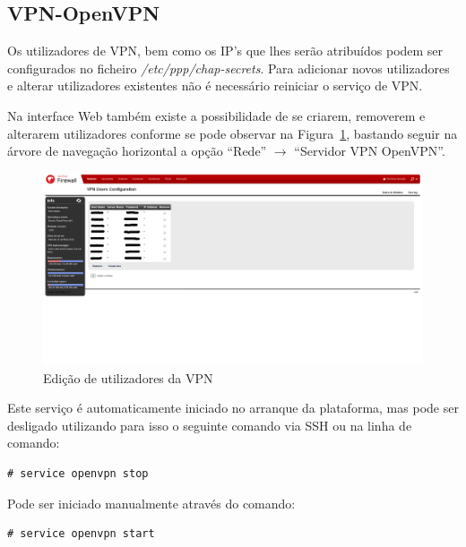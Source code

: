 \subsection*{VPN-OpenVPN}

Os utilizadores de VPN, bem como os IP's que lhes serão atribuídos podem ser
configurados no ficheiro \emph{/etc/ppp/chap-secrets}.
Para adicionar novos utilizadores e alterar utilizadores existentes não é necessário reiniciar o serviço de VPN.

Na interface Web também existe a possibilidade de se criarem, removerem e alterarem
utilizadores conforme se pode observar na Figura~\ref{fig:vpn}, bastando seguir na árvore de navegação horizontal a opção ``Rede'' $\rightarrow$ ``Servidor VPN OpenVPN''.

\begin{figure}[H]
\begin{center}
\includegraphics[width=15cm]{../include/img/vpn}
\end{center}
\caption{Edição de utilizadores da VPN}
\label{fig:vpn}
\end{figure}

Este serviço é automaticamente iniciado no arranque da plataforma, mas pode ser desligado utilizando para isso o seguinte comando via SSH ou na linha de comando:

\begin{verbatim}
# service openvpn stop
\end{verbatim}

Pode ser iniciado manualmente através do comando:

\begin{verbatim}
# service openvpn start
\end{verbatim}
